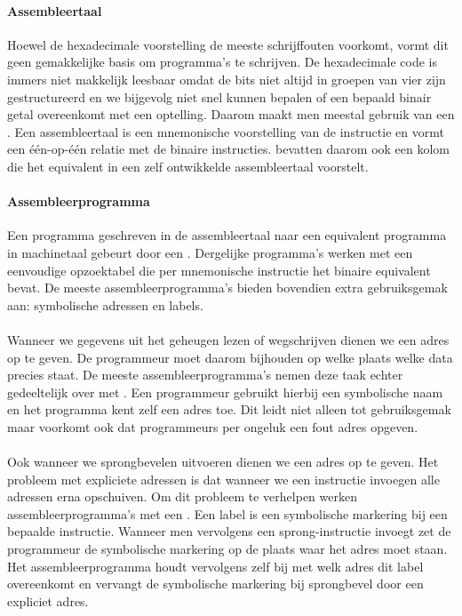 \paragraph{Assembleertaal}
Hoewel de hexadecimale voorstelling de meeste schrijffouten voorkomt, vormt dit geen gemakkelijke basis om programma's te schrijven. De hexadecimale code is immers niet makkelijk leesbaar omdat de bits niet altijd in groepen van vier zijn gestructureerd en we bijgevolg niet snel kunnen bepalen of een bepaald binair getal overeenkomt met een optelling. Daarom maakt men meestal gebruik van een . Een assembleertaal is een mnemonische voorstelling van de instructie en vormt een \'e\'en-op-\'e\'en relatie met de binaire instructies.  bevatten daarom ook een kolom die het equivalent in een zelf ontwikkelde assembleertaal voorstelt.
\paragraph{Assembleerprogramma}
Een programma geschreven in de assembleertaal naar een equivalent programma in machinetaal gebeurt door een . Dergelijke programma's werken met een eenvoudige opzoektabel die per mnemonische instructie het binaire equivalent bevat. De meeste assembleerprogramma's bieden bovendien extra gebruiksgemak aan: symbolische adressen en labels.
\paragraph{}
Wanneer we gegevens uit het geheugen lezen of wegschrijven dienen we een adres op te geven. De programmeur moet daarom bijhouden op welke plaats welke data precies staat. De meeste assembleerprogramma's nemen deze taak echter gedeeltelijk over met . Een programmeur gebruikt hierbij een symbolische naam en het programma kent zelf een adres toe. Dit leidt niet alleen tot gebruiksgemak maar voorkomt ook dat programmeurs per ongeluk een fout adres opgeven.
\paragraph{}
Ook wanneer we sprongbevelen uitvoeren dienen we een adres op te geven. Het probleem met expliciete adressen is dat wanneer we een instructie invoegen alle adressen erna opschuiven. Om dit probleem te verhelpen werken assembleerprogramma's met een . Een label is een symbolische markering bij een bepaalde instructie. Wanneer men vervolgens een sprong-instructie invoegt zet de programmeur de symbolische markering op de plaats waar het adres moet staan. Het assembleerprogramma houdt vervolgens zelf bij met welk adres dit label overeenkomt en vervangt de symbolische markering bij sprongbevel door een expliciet adres.
